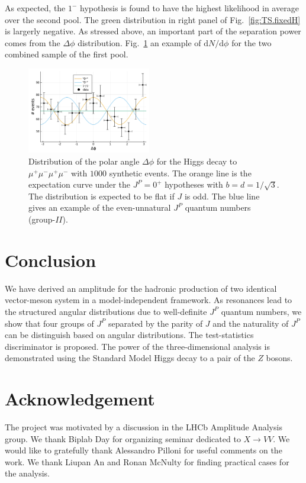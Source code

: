\documentclass[prd,preprintnumbers,floatfix,
nofootinbib,superscriptaddress]{revtex4}
\newcommand{\diff}{\mathrm{d}}
\newcommand{\II}{\ensuremath{{I\!I}}}
\begin{document}
As expected, the $1^-$ hypothesis is found to have the highest likelihood in average over the second pool. The green distribution in right panel of Fig.~\ref{fig:TS.fixedH} is largerly negative. As stressed above, an important part of the separation power comes from the $\Delta\phi$ distribution.
Fig.~\ref{fig:higgs.phi} an example of $\diff N / \diff \phi$ for the two combined sample of the first pool.
\begin{figure}
  \includegraphics[width=0.48\textwidth]{../plots/phi_higgs.pdf}
  \caption{Distribution of the polar angle $\Delta\phi$ for the Higgs decay to $\mu^+\mu^-\mu^+\mu^-$ with $1000$ synthetic events.
  The orange line is the expectation curve under the $J^P=0^+$ hypotheses with $b=d=1/\sqrt{3}$.
  The distribution is expected to be flat if $J$ is odd.
  The blue line gives an example of the even-unnatural $J^P$ quantum numbers (group-\II).}
  \label{fig:higgs.phi}
\end{figure}

\section{Conclusion}
We have derived an amplitude for the hadronic production of two identical vector-meson system in a model-independent framework.
As resonances lead to the structured angular distributions due to well-definite $J^P$ quantum numbers,
we show that four groups of $J^P$ separated by the parity of $J$ and the naturality of $J^P$ can be distinguish based on angular distributions.
The test-statistics discriminator is proposed.
The power of the three-dimensional analysis is demonstrated using the Standard Model Higgs decay to a pair of the $Z$ bosons.

\section*{Acknowledgement}
The project was motivated by a discussion in the LHCb Amplitude Analysis group.
We thank Biplab Day for organizing seminar dedicated to $X\to VV$.
We would like to gratefully thank Alessandro Pilloni for useful comments on the work.
We thank Liupan An and Ronan McNulty for finding practical cases for the analysis.
\end{document}
